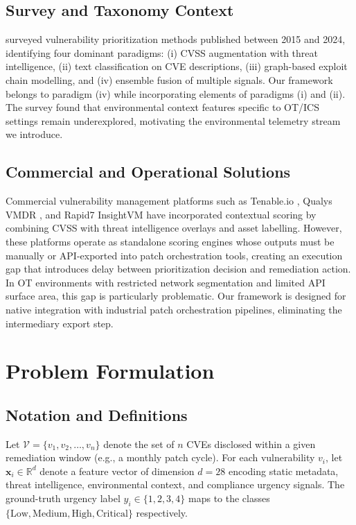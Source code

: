 \documentclass[review,12pt]{elsarticle}
\begin{document}
\subsection{Survey and Taxonomy Context}

\citet{jiang2025} surveyed vulnerability prioritization methods published between 2015 and 2024, identifying four dominant paradigms: (i) CVSS augmentation with threat intelligence, (ii) text classification on CVE descriptions, (iii) graph-based exploit chain modelling, and (iv) ensemble fusion of multiple signals. Our framework belongs to paradigm (iv) while incorporating elements of paradigms (i) and (ii). The survey found that environmental context features specific to OT/ICS settings remain underexplored, motivating the environmental telemetry stream we introduce.

\subsection{Commercial and Operational Solutions}

Commercial vulnerability management platforms such as Tenable.io \citep{tenable}, Qualys VMDR \citep{qualys}, and Rapid7 InsightVM \citep{rapid7} have incorporated contextual scoring by combining CVSS with threat intelligence overlays and asset labelling. However, these platforms operate as standalone scoring engines whose outputs must be manually or API-exported into patch orchestration tools, creating an execution gap that introduces delay between prioritization decision and remediation action. In OT environments with restricted network segmentation and limited API surface area, this gap is particularly problematic. Our framework is designed for native integration with industrial patch orchestration pipelines, eliminating the intermediary export step.

\section{Problem Formulation}
\label{sec:formulation}

\subsection{Notation and Definitions}

Let $\mathcal{V} = \{v_1, v_2, \ldots, v_n\}$ denote the set of $n$ CVEs disclosed within a given remediation window (e.g., a monthly patch cycle). For each vulnerability $v_i$, let $\mathbf{x}_i \in \mathbb{R}^d$ denote a feature vector of dimension $d = 28$ encoding static metadata, threat intelligence, environmental context, and compliance urgency signals. The ground-truth urgency label $y_i \in \{1, 2, 3, 4\}$ maps to the classes $\{\text{Low}, \text{Medium}, \text{High}, \text{Critical}\}$ respectively.
\end{document}
